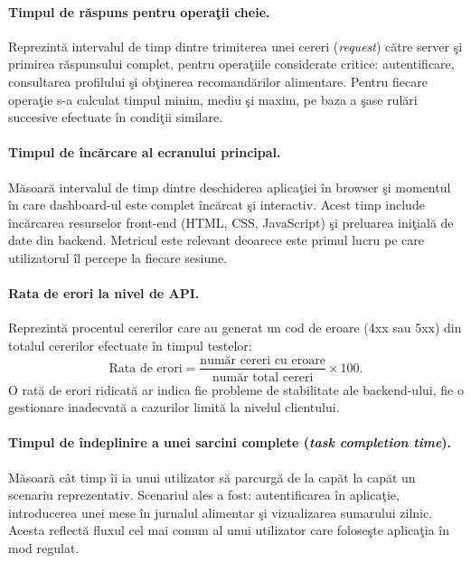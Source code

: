 \documentclass[12pt,a4paper]{article}
\begin{document}
\paragraph{Timpul de r\u{a}spuns pentru opera\c{t}ii cheie.}
Reprezint\u{a} intervalul de timp dintre trimiterea unei cereri (\textit{request}) c\u{a}tre server \c{s}i primirea r\u{a}spunsului complet, pentru opera\c{t}iile considerate critice: autentificare, consultarea profilului \c{s}i ob\c{t}inerea recomand\u{a}rilor alimentare. Pentru fiecare opera\c{t}ie s-a calculat timpul minim, mediu \c{s}i maxim, pe baza a \c{s}ase rul\u{a}ri succesive efectuate \^{i}n condi\c{t}ii similare.

\paragraph{Timpul de \^{i}nc\u{a}rcare al ecranului principal.}
M\u{a}soar\u{a} intervalul de timp dintre deschiderea aplica\c{t}iei \^{i}n browser \c{s}i momentul \^{i}n care dashboard-ul este complet \^{i}nc\u{a}rcat \c{s}i interactiv. Acest timp include \^{i}nc\u{a}rcarea resurselor front-end (HTML, CSS, JavaScript) \c{s}i preluarea ini\c{t}ial\u{a} de date din backend. Metricul este relevant deoarece este primul lucru pe care utilizatorul \^{i}l percepe la fiecare sesiune.

\paragraph{Rata de erori la nivel de API.}
Reprezint\u{a} procentul cererilor care au generat un cod de eroare (4xx sau 5xx) din totalul cererilor efectuate \^{i}n timpul testelor:
\begin{equation}
  \text{Rata de erori} = \frac{\text{num\u{a}r cereri cu eroare}}{\text{num\u{a}r total cereri}} \times 100.
\end{equation}
O rat\u{a} de erori ridicat\u{a} ar indica fie probleme de stabilitate ale backend-ului, fie o gestionare inadecvat\u{a} a cazurilor limit\u{a} la nivelul clientului.

\paragraph{Timpul de \^{i}ndeplinire a unei sarcini complete (\textit{task completion time}).}
M\u{a}soar\u{a} c\^{a}t timp \^{i}i ia unui utilizator s\u{a} parcurg\u{a} de la cap\u{a}t la cap\u{a}t un scenariu reprezentativ. Scenariul ales a fost: autentificarea \^{i}n aplica\c{t}ie, introducerea unei mese \^{i}n jurnalul alimentar \c{s}i vizualizarea sumarului zilnic. Acesta reflect\u{a} fluxul cel mai comun al unui utilizator care folose\c{s}te aplica\c{t}ia \^{i}n mod regulat.
\end{document}
